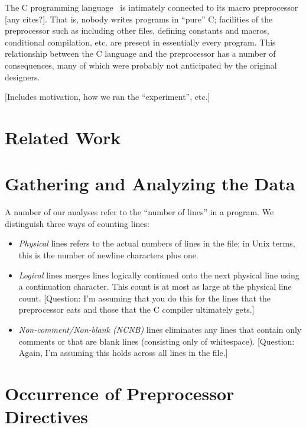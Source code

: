 The C programming language~\cite{kr,ansi} is intimately connected to
its macro preprocessor [any cites?].  That is, nobody writes programs
in ``pure'' C; facilities of the preprocessor such as including other
files, defining constants and macros, conditional compilation,
etc. are present in essentially every program.  This relationship
between the C language and the preprocessor has a number of
consequences, many of which were probably not anticipated by the
original designers.  

[Includes motivation, how we ran the ``experiment'', etc.]

\section{Related Work}\label{sec:related}

\section{Gathering and Analyzing the Data}\label{sec:gathering}

A number of our analyses refer to the ``number of lines'' in a
program.  We distinguish three ways of counting lines:
\begin{itemize}

\item {\em Physical} lines refers to the actual numbers of lines in
the file; in Unix terms, this is the number of newline characters plus
one.  

\item {\em Logical} lines merges lines logically continued onto the
next physical line using a continuation character.  This count is at
most as large at the physical line count. [Question: I'm assuming that
you do this for the lines that the preprocessor eats and those that
the C compiler ultimately gets.]

\item {\em Non-comment/Non-blank (NCNB)} lines eliminates any lines
that contain only comments or that are blank lines (consisting only of
whitespace).  [Question: Again, I'm assuming this holds across all
lines in the file.]

\end{itemize}

\section{Occurrence of Preprocessor Directives}\label{sec:directives}

